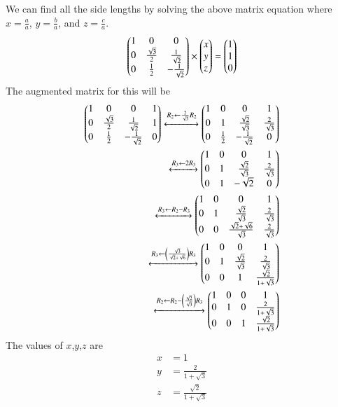 \documentclass[journal]{IEEEtran}
\begin{document}
We can find all the side lengths by solving the above matrix equation where $x=\frac{a}{a}$, $y=\frac{b}{a}$, and $z=\frac{c}{a}$.
\begin{align}
  \begin{pmatrix}1 & 0 & 0\\0 & \frac{\sqrt{3}}{2} & \frac{1}{\sqrt{2}}\\0 & \frac{1}{2} & -\frac{1}{\sqrt{2}}\end{pmatrix}\times\begin{pmatrix}x\\y\\z\end{pmatrix}&=\begin{pmatrix}1\\1\\0\end{pmatrix}\\
\end{align}
The augmented matrix for this will be
\begin{align}
  \begin{pmatrix}1 & 0 & 0 & 1\\0 & \frac{\sqrt{3}}{2} & \frac{1}{\sqrt{2}} & 1\\0 & \frac{1}{2} & -\frac{1}{\sqrt{2}} & 0\end{pmatrix} \xleftrightarrow[]{R_2 \leftarrow \frac{2}{\sqrt{3}}R_2}\begin{pmatrix}1 & 0 & 0 & 1\\0 & 1 & \frac{\sqrt{2}}{\sqrt{3}} & \frac{2}{\sqrt{3}}\\0 & \frac{1}{2} & -\frac{1}{\sqrt{2}} & 0\end{pmatrix}\\
  \xleftrightarrow[]{R_3 \leftarrow 2R_3}\begin{pmatrix}1 & 0 & 0 & 1\\0 & 1 & \frac{\sqrt{2}}{\sqrt{3}} & \frac{2}{\sqrt{3}}\\0 & 1 & -\sqrt{2} & 0\end{pmatrix}\\
  \xleftrightarrow[]{R_3 \leftarrow R_2-R_3}\begin{pmatrix}1 & 0 & 0 & 1\\0 & 1 & \frac{\sqrt{2}}{\sqrt{3}} & \frac{2}{\sqrt{3}}\\0 & 0 & \frac{\sqrt{2}+\sqrt{6}}{\sqrt{3}} & \frac{2}{\sqrt{3}}\end{pmatrix}\\
  \xleftrightarrow[]{R_3 \leftarrow \ensuremath{\left(\frac{\sqrt{3}}{\sqrt{2}+\sqrt{6}}\right)}R_3}\begin{pmatrix}1 & 0 & 0 & 1\\0 & 1 & \frac{\sqrt{2}}{\sqrt{3}} & \frac{2}{\sqrt{3}}\\0 & 0 & 1 & \frac{\sqrt{2}}{1+\sqrt{3}}\end{pmatrix}\\
  \xleftrightarrow[]{R_2 \leftarrow R_2-\ensuremath{\left(\frac{\sqrt{2}}{\sqrt{3}}\right)}R_3}\begin{pmatrix}1 & 0 & 0 & 1\\0 & 1 & 0 & \frac{2}{1+\sqrt{3}}\\0 & 0 & 1 & \frac{\sqrt{2}}{1+\sqrt{3}}\end{pmatrix}
\end{align}
The values of $x$,$y$,$z$ are
\begin{align}
x&=1\\
y&=\frac{2}{1+\sqrt{3}}\\
z&=\frac{\sqrt{2}}{1+\sqrt{3}}
\end{align}
\end{document}
